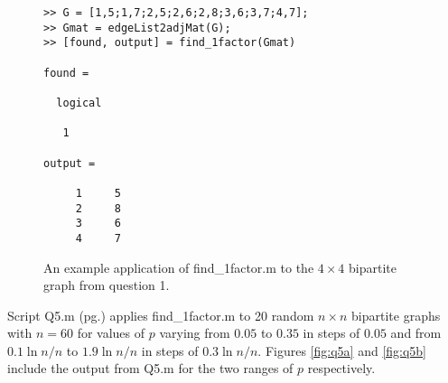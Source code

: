 \documentclass[a4paper]{article}
\begin{document}
\begin{figure}[H]
    \centering
    \begin{minipage}{0.65\textwidth}
        \centering
        \begin{verbatim}
>> G = [1,5;1,7;2,5;2,6;2,8;3,6;3,7;4,7];
>> Gmat = edgeList2adjMat(G);
>> [found, output] = find_1factor(Gmat)

found =

  logical

   1

output =

     1     5
     2     8
     3     6
     4     7
        \end{verbatim}
    \end{minipage}\hfill
    \begin{minipage}{0.35\textwidth}
        \centering
    \end{minipage}
    \caption{An example application of find\_1factor.m to the $4\times 4$ bipartite graph from question 1.}
    \label{fig:Q5ex}
\end{figure}

\bigskip
Script Q5.m (pg.\pageref{PQ5}) applies find\_1factor.m to 20 random $n \times n$ bipartite graphs with $n=60$ for values of $p$ varying from $0.05$ to $0.35$ in steps of $0.05$ and from $0.1\ln{n}/n$ to $1.9\ln{n}/n$ in steps of $0.3\ln{n}/n$. Figures \ref{fig:q5a} and \ref{fig:q5b} include the output from Q5.m for the two ranges of $p$ respectively.
\end{document}
